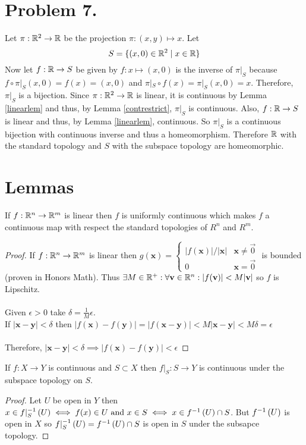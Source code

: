 \documentclass[12pt]{extarticle}
\begin{document}
\section*{Problem 7.}

Let $\pi : \mathbb{R}^2 \rightarrow \mathbb{R}$ be the projection $\pi : (x,y) \mapsto x$. Let \[S = \{ (x,0) \in \mathbb{R}^2 \mid x \in \mathbb{R} \}\]
Now let $f : \mathbb{R} \rightarrow S$ be given by $f : x \mapsto (x,0)$ is the inverse of $\pi |_S$ because $f \circ \pi |_S(x,0) = f(x) = (x, 0)$ and $\pi |_S \circ f(x) = \pi |_S(x, 0) = x$.  Therefore, $\pi |_S$ is a bijection. Since $\pi : \mathbb{R}^2 \rightarrow \mathbb{R}$ is linear, it is continuous by Lemma \ref{linearlem} and thus, by Lemma \ref{contrestrict}, $\pi |_S$ is continuous. Also, $f : \mathbb{R} \rightarrow S$ is linear and thus, by Lemma \ref{linearlem}, continuous. So $\pi |_S$ is a continuous bijection with continuous inverse and thus a homeomorphism. Therefore $\mathbb{R}$ with the standard topology and $S$ with the subspace topology are homeomorphic. 

\section*{Lemmas}

\begin{lemma} \label{linearlem}
If $f : \mathbb{R}^n \rightarrow \mathbb{R}^m$ is linear then $f$ is uniformly continuous which makes $f$ a continuous map with respect the standard topologies of $R^n$ and $R^m$.
\end{lemma}

\begin{proof}
If $f : \mathbb{R}^n \rightarrow \mathbb{R}^m$ is linear then $g(\mathbf{x}) = \begin{cases} |f(\mathbf{x})|/|\mathbf{x}| & \mathbf{x} \neq \vec{0} \\
0 & \mathbf{x} = \vec{0} \end{cases}$ \quad is bounded \\ (proven in Honors Math). Thus $\exists M \in \mathbb{R}^+ : \forall \mathbf{v} \in \mathbb{R}^n : |f(\mathbf{v})| < M |\mathbf{v}|$ so $f$ is Lipschitz. \\ \\
Given $\epsilon > 0$ take $\delta = \frac{1}{M} \epsilon$.  \\
If $|\mathbf{x} - \mathbf{y}| < \delta$ then $|f(\mathbf{x}) - f(\mathbf{y})| = |f(\mathbf{x} - \mathbf{y})| < M |\mathbf{x} - \mathbf{y}| < M \delta = \epsilon$ \\ \\
Therefore, $|\mathbf{x} - \mathbf{y}| < \delta \implies |f(\mathbf{x}) - f(\mathbf{y})| < \epsilon$
\end{proof}

\begin{lemma} \label{contrestrict}
If $f : X \rightarrow Y$ is continuous and $S \subset X$ then $f |_{S} : S \rightarrow Y$ is continuous under the subspace topology on $S$.
\end{lemma}
\begin{proof}
Let $U$ be open in $Y$ then $x \in f|_S^{-1} \left( U \right) \iff f(x) \in U \text{ and } x \in S \iff x \in f^{-1} \left( U \right) \cap S$. But $f^{-1} \left( U \right)$ is open in $X$ so $f|_S^{-1} \left( U \right) = f^{-1} \left( U \right) \cap S$ is open in $S$ under the subsapce topology. 
\end{proof}
\end{document}
